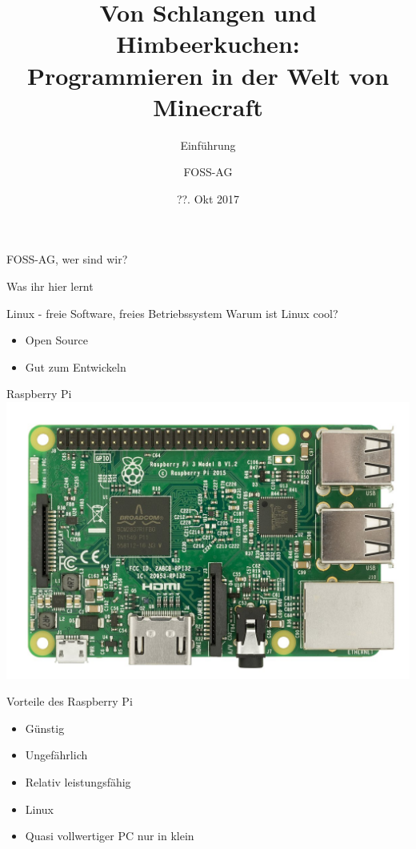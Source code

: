 \documentclass[utf8]{beamer}
\title{Von Schlangen und Himbeerkuchen:\\Programmieren in der Welt von Minecraft}
\subtitle{Einführung}
\author{FOSS-AG}
\institute[FOSS AG]{\textbf{F}ree and \textbf{O}pen \textbf{S}ource \textbf{S}oftware \textbf{AG}}
\date{??. Okt 2017}
\begin{document}
	\begin{frame}
		\titlepage
	\end{frame}
	
	
	\begin{frame}{FOSS-AG, wer sind wir?}
		
	\end{frame}
	
	\begin{frame}{Was ihr hier lernt}
		
	\end{frame}
	
	\begin{frame}{Linux - freie Software, freies Betriebssystem}
		Warum ist Linux cool?
		\begin{itemize}
			\item Open Source
			\item Gut zum Entwickeln
		\end{itemize}
	\end{frame}
	
	\begin{frame}{Raspberry Pi}
		\center\includegraphics[width=\textwidth]{img/1200px-Raspberry-Pi-3-Flat-Top.jpg}
		
	\end{frame}
	
	\begin{frame}{Vorteile des Raspberry Pi}
		
		\begin{itemize}
			\item Günstig
			\item Ungefährlich
			\item Relativ leistungsfähig
			\item Linux
			\item Quasi vollwertiger PC nur in klein
		\end{itemize}
	\end{frame}
	
	
	
	
	
	
\end{document}
